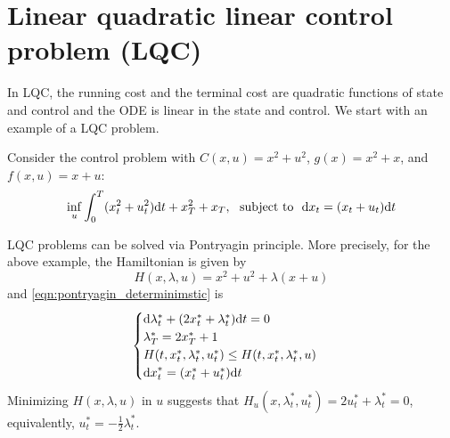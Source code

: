 \documentclass[11pt]{book}
\newcommand{\dd}{\text{\normalfont d}}
\newcommand{\dt}{\text{\normalfont d}t}
\newcommand{\dx}{\text{\normalfont d}x}
\begin{document}
\section{Linear quadratic linear control problem (LQC)}
\label{sec:LQC}
In LQC, the running cost and the terminal cost are quadratic functions of state  and control and the ODE is linear in the state  and control.
We start with an example of a LQC problem. 
\begin{eg}\label{eg:lqc}
    Consider the control problem with $C(x,u)= x^2 +  u^2$, $g(x) = x^2 +  x$, and $f(x,u)=x + u$:
\begin{equation}
    \inf_{u}\int_0^T(x_t^2 + u_t^2 ){{\dt}} + x^2_T + x_T,~\text{ subject to  }~{\dx}_t=( x_t +  u_t){{\dt}}
\end{equation}
\end{eg}
LQC problems can be solved via Pontryagin principle. More precisely,  for the above example, the Hamiltonian is given by
\[
H(x,\lambda,u) = x^2 + u^2 + \lambda ( x + u)
\]
and \eqref{eqn:pontryagin_determinimstic} is 
\begin{equation}\label{eg:pontryagin_lqc}
    \begin{cases}
        {\dd}\lambda^*_t+ (2x^*_t + \lambda^*_t ){{\dt}}=0\\
        \lambda^*_T= 2x^*_T + 1\\
        H(t,x^*_t,\lambda^*_t,u^*_t)\le H(t,x^*_t,\lambda^*_t,u)\\
        {\dx}^*_t=( x^*_t + u^*_t){{\dt}}
        \end{cases}
\end{equation}
Minimizing $H(x,\lambda,u)$ in $u$ suggests that $H_u(x,\lambda^*_t,u^*_t)=2u^*_t+  \lambda^*_t =0$, equivalently, $u^*_t=-\frac{1}{2}\lambda^*_t$.
\end{document}
